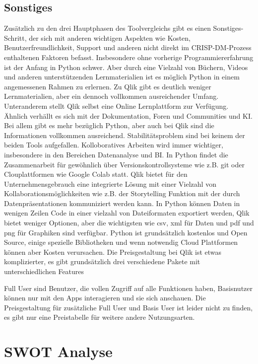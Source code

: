 \documentclass[12pt]{article}
\begin{document}
	\subsection{Sonstiges}
	Zusätzlich zu den drei Hauptphasen des Toolvergleichs gibt es einen Sonstiges-Schritt, der sich mit anderen wichtigen Aspekten wie Kosten, Benutzerfreundlichkeit, Support und anderen nicht direkt im CRISP-DM-Prozess enthaltenen Faktoren befasst.
	Insbesondere ohne vorherige Programmiererfahrung ist der Anfang in Python schwer. Aber durch eine Vielzahl von Büchern, Videos und anderen unterstützenden Lernmaterialien ist es möglich Python in einem angemessenen Rahmen zu erlernen. Zu Qlik gibt es deutlich weniger Lernmaterialien, aber ein dennoch vollkommen ausreichender Umfang. Unteranderem stellt Qlik selbst eine Online Lernplattform zur Verfügung. Ähnlich verhällt es sich mit der Dokumentation, Foren und Communities und KI. Bei allem gibt es mehr bezüglich Python, aber auch bei Qlik sind die Informationen vollkommen ausreichend. Stabilitätsproblem sind bei keinem der beiden Tools aufgefallen. Kolloboratives Arbeiten wird immer wichtiger, insbesondere in den Bereichen Datenanalyse und BI. In Python findet die Zusammenarbeit für gewöhnlich über Versionskontrollsysteme wie z.B. git oder Clouplattformen wie Google Colab statt. Qlik bietet für den Unternehmensgebrauch eine integrierte Lösung mit einer Vielzahl von Kollaborationsmöglichkeiten wie z.B. der Storytelling Funktion mit der durch Datenpräsentationen kommuniziert werden kann.
	In Python können Daten in wenigen Zeilen Code in einer vielzahl von Dateiformaten exportiert werden, Qlik bietet weniger Optionen, aber die wichtigsten wie csv, xml für Daten und pdf und png für Graphiken sind verfügbar. Python ist grundsätzlich kostenlos und Open Source, einige spezielle Bibliotheken und wenn notwendig Cloud Plattformen können aber Kosten verursachen. Die Preisgestaltung bei Qlik ist etwas komplizierter, es gibt grundsätzlich drei verschiedene Pakete mit unterschiedlichen Features %
	
	Full User sind Benutzer, die vollen Zugriff auf alle Funktionen haben, Basisnutzer können nur mit den Apps interagieren und sie sich anschauen.
	Die Preisgestaltung für zusätzliche Full User und Basis User ist leider nicht zu finden, es gibt nur eine Preistabelle für weitere andere Nutzungsarten.
	\section{SWOT Analyse}
	
\end{document}
